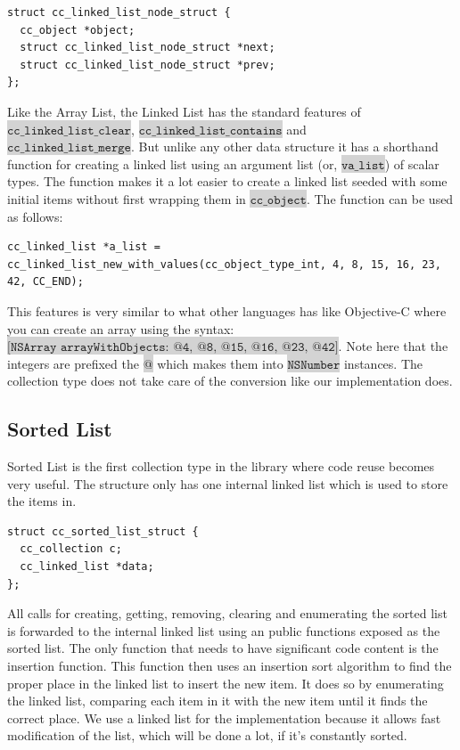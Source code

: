 \documentclass[table]{ituthesis}
\newcommand{\highlight}[1]{\colorbox{lightGray}{$\displaystyle \texttt{#1}$}}
\begin{document}
\begin{lstlisting}[label=cc_linked_list-struct,caption=Internal representation of Linked List node]
struct cc_linked_list_node_struct {
  cc_object *object;
  struct cc_linked_list_node_struct *next;
  struct cc_linked_list_node_struct *prev;
};
\end{lstlisting}

	Like the Array List, the Linked List has the standard features of \highlight{cc\_linked\_list\_clear}, \highlight{cc\_linked\_list\_contains} and \\\highlight{cc\_linked\_list\_merge}. But unlike any other data structure it has a shorthand function for creating a linked list using an argument list (or, \highlight{va\_list}) of scalar types. The function makes it a lot easier to create a linked list seeded with some initial items without first wrapping them in \highlight{cc\_object}. The function can be used as follows:
	
\begin{lstlisting}[label=cc_linked_list-struct,caption=Creating a linked list with an argument list]
cc_linked_list *a_list = cc_linked_list_new_with_values(cc_object_type_int, 4, 8, 15, 16, 23, 42, CC_END);
\end{lstlisting}

	This features is very similar to what other languages has like Objective-C where you can create an array using the syntax:\\
	\highlight{[NSArray arrayWithObjects: @4, @8, @15, @16, @23, @42]}. Note here that the integers are prefixed the \highlight{@} which makes them into \highlight{NSNumber} instances. The collection type does not take care of the conversion like our implementation does.
	
	\subsection{Sorted List}
	
	Sorted List is the first collection type in the library where code reuse becomes very useful. The structure only has one internal linked list which is used to store the items in.
	
\begin{lstlisting}[label=cc_sorted_list-struct,caption=Internal representation of Sorted List]
struct cc_sorted_list_struct {
  cc_collection c;
  cc_linked_list *data;
};
\end{lstlisting}

	All calls for creating, getting, removing, clearing and enumerating the sorted list is forwarded to the internal linked list using an public functions exposed as the sorted list. The only function that needs to have significant code content is the insertion function. This function then uses an insertion sort algorithm to find the proper place in the linked list to insert the new item. It does so by enumerating the linked list, comparing each item in it with the new item until it finds the correct place. We use a linked list for the implementation because it allows fast modification of the list, which will be done a lot, if it's constantly sorted.
	
\end{document}
